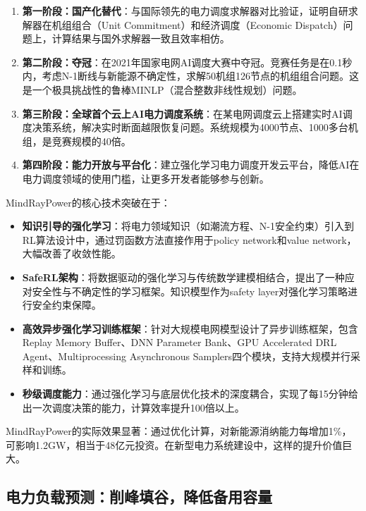 \begin{enumerate}
    \item \textbf{第一阶段：国产化替代}：与国际领先的电力调度求解器对比验证，证明自研求解器在机组组合（Unit Commitment）和经济调度（Economic Dispatch）问题上，计算结果与国外求解器一致且效率相仿。

    \item \textbf{第二阶段：夺冠}：在2021年国家电网AI调度大赛中夺冠。竞赛任务是在0.1秒内，考虑N-1断线与新能源不确定性，求解50机组126节点的机组组合问题。这是一个极具挑战性的鲁棒MINLP（混合整数非线性规划）问题。

    \item \textbf{第三阶段：全球首个云上AI电力调度系统}：在某电网调度云上搭建实时AI调度决策系统，解决实时断面越限恢复问题。系统规模为4000节点、1000多台机组，是竞赛规模的40倍。

    \item \textbf{第四阶段：能力开放与平台化}：建立强化学习电力调度开发云平台，降低AI在电力调度领域的使用门槛，让更多开发者能够参与创新。
\end{enumerate}

MindRayPower的核心技术突破在于：

\begin{itemize}
    \item \textbf{知识引导的强化学习}：将电力领域知识（如潮流方程、N-1安全约束）引入到RL算法设计中，通过罚函数方法直接作用于policy network和value network，大幅改善了收敛性能。

    \item \textbf{SafeRL架构}：将数据驱动的强化学习与传统数学建模相结合，提出了一种应对安全性与不确定性的学习框架。知识模型作为safety layer对强化学习策略进行安全约束保障。

    \item \textbf{高效异步强化学习训练框架}：针对大规模电网模型设计了异步训练框架，包含Replay Memory Buffer、DNN Parameter Bank、GPU Accelerated DRL Agent、Multiprocessing Asynchronous Samplers四个模块，支持大规模并行采样和训练。

    \item \textbf{秒级调度能力}：通过强化学习与底层优化技术的深度耦合，实现了每15分钟给出一次调度决策的能力，计算效率提升100倍以上。
\end{itemize}

MindRayPower的实际效果显著：通过优化计算，对新能源消纳能力每增加1\%，可影响1.2GW，相当于48亿元投资。在新型电力系统建设中，这样的提升价值巨大。

\subsection{电力负载预测：削峰填谷，降低备用容量}

